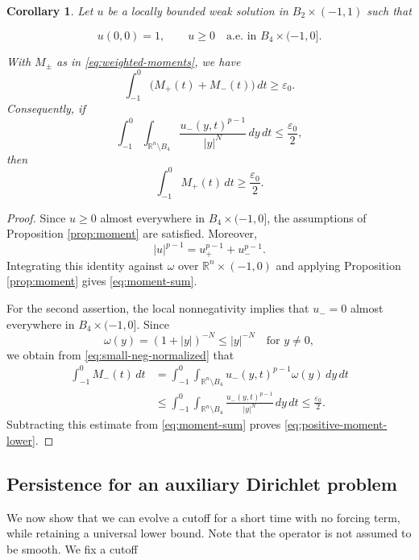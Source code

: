 \documentclass[10pt]{amsart}
\theoremstyle{plain}
\newtheorem{corollary}[lemma]{Corollary}
\theoremstyle{definition}
\theoremstyle{remark}
\numberwithin{equation}{section}
\newcommand{\R}{\mathbb R}
\begin{document}
\begin{corollary}
\label{cor:positive-moment}
Let $u$ be a locally bounded weak solution in $B_2\times(-1,1)$ such that

\[
    u(0,0)=1,
    \qquad
    u\ge0
    \quad\text{a.e. in }B_4\times(-1,0].
\]

With $M_\pm$ as in \eqref{eq:weighted-moments}, we have
\begin{equation}\label{eq:moment-sum}
\int_{-1}^0\bigl(M_+(t)+M_-(t)\bigr)\,dt
\ge\varepsilon_0.
\end{equation}
Consequently, if
\begin{equation}\label{eq:small-neg-normalized}
\int_{-1}^0
\int_{\R^n\setminus B_4}
\frac{u_-(y,t)^{p-1}}{|y|^N}\,dy\,dt
\le\frac{\varepsilon_0}{2},
\end{equation}
then
\begin{equation}\label{eq:positive-moment-lower}
\int_{-1}^0M_+(t)\,dt
\ge\frac{\varepsilon_0}{2}.
\end{equation}
\end{corollary}

\begin{proof}
Since $u\ge0$ almost everywhere in $B_4\times(-1,0]$, the assumptions of
Proposition \ref{prop:moment} are satisfied. Moreover,
\[
|u|^{p-1}=u_+^{p-1}+u_-^{p-1}.
\]
Integrating this identity against $\omega$ over
$\R^n\times(-1,0)$ and applying Proposition \ref{prop:moment} gives
\eqref{eq:moment-sum}.

For the second assertion, the local nonnegativity implies that
$u_-=0$ almost everywhere in $B_4\times(-1,0]$. Since
\[
\omega(y)=(1+|y|)^{-N}\le |y|^{-N}
\quad\text{for }y\ne0,
\]
we obtain from \eqref{eq:small-neg-normalized} that
\begin{align*}
\int_{-1}^0M_-(t)\,dt
&=
\int_{-1}^0
\int_{\R^n\setminus B_4}
u_-(y,t)^{p-1}\omega(y)\,dy\,dt
\\
&\le
\int_{-1}^0
\int_{\R^n\setminus B_4}
\frac{u_-(y,t)^{p-1}}{|y|^N}\,dy\,dt
\le
\frac{\varepsilon_0}{2}.
\end{align*}
Subtracting this estimate from \eqref{eq:moment-sum} proves
\eqref{eq:positive-moment-lower}.
\end{proof}


\subsection{Persistence for an auxiliary Dirichlet problem}
We now show that we can evolve a cutoff for a short time with no
forcing term, while retaining a universal lower bound. Note that the 
operator is not assumed to be smooth. 
We fix a cutoff
\end{document}
